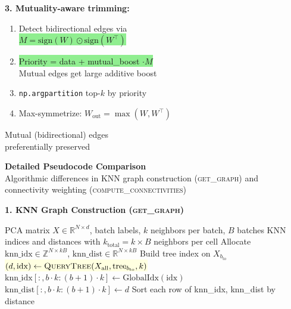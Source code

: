 \documentclass[8pt]{article}
\newlength{\colw}
\begin{document}
\begin{minipage}[t]{\colw}
\begin{keyboxG}
\textbf{3. Mutuality-aware trimming:}
\begin{enumerate}[leftmargin=1em, itemsep=0pt, topsep=1pt, parsep=0pt]
\item Detect bidirectional edges via\\
    \colorbox{lightgreen}{$M = \text{sign}(W) \odot \text{sign}(W^\top)$}
\item \colorbox{lightgreen}{Priority = data + mutual\_boost $\cdot M$}\\
    {\scriptsize Mutual edges get large additive boost}
\item \texttt{np.argpartition} top-$k$ by priority
\item Max-symmetrize: $W_\text{out} = \max(W, W^\top)$
\end{enumerate}
{\scriptsize\color{added} Mutual (bidirectional) edges\\
preferentially preserved}
\end{keyboxG}
\end{minipage}

\newpage

\begin{center}
{\large\bfseries Detailed Pseudocode Comparison}\\[3pt]
{\normalsize Algorithmic differences in KNN graph construction (\textsc{get\_graph}) and connectivity weighting (\textsc{compute\_connectivities})}
\end{center}
\vspace{4pt}

{\large\bfseries 1. KNN Graph Construction (\textsc{get\_graph})}

\vspace{3pt}

\begin{tcolorbox}[
    title={\textbf{Algorithm 1a:} Original BBKNN --- All-vs-All Batch Query},
    colback=white, colframe=black!60, fonttitle=\small\bfseries,
    boxrule=0.5pt, arc=2pt, left=4pt, right=4pt, top=2pt, bottom=2pt
]
\begin{algorithmic}[1]
\small
\Require PCA matrix $X \in \mathbb{R}^{N \times d}$, batch labels, $k$ neighbors per batch, $B$ batches
\Ensure KNN indices and distances with $k_\text{total} = k \times B$ neighbors per cell
\State Allocate $\text{knn\_idx} \in \mathbb{Z}^{N \times kB}$, $\text{knn\_dist} \in \mathbb{R}^{N \times kB}$
    \State Build tree index on $X_{b_\text{to}}$
    \State \colorbox{lightyellow}{$(d, \text{idx}) \gets \textsc{QueryTree}(X_\text{all}, \text{tree}_{b_\text{to}}, k)$} \Comment{\textcolor{removed}{All $N$ cells query each batch}}
    \State $\text{knn\_idx}[:, b \cdot k : (b{+}1) \cdot k] \gets \text{GlobalIdx}(\text{idx})$
    \State $\text{knn\_dist}[:, b \cdot k : (b{+}1) \cdot k] \gets d$
\EndFor
\State Sort each row of knn\_idx, knn\_dist by distance
\end{algorithmic}
\end{tcolorbox}
\end{document}
